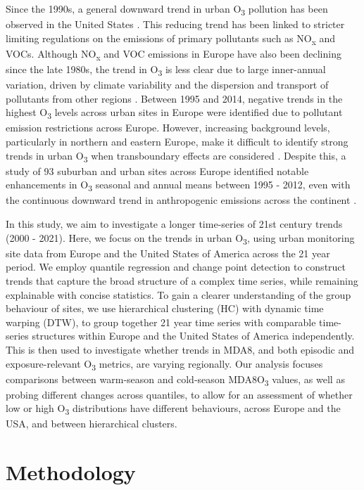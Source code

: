 \documentclass[journal abbreviation, manuscript]{copernicus}
\begin{document}
Since the 1990s, a general downward trend in urban O\textsubscript{3} pollution has been observed in the United States \citep{acp-20-3191-2020}. This reducing trend has been linked to stricter limiting regulations on the emissions of primary pollutants such as NO\textsubscript{x} and VOCs. Although NO\textsubscript{x} and VOC emissions in Europe have also been declining since the late 1980s, the trend in O\textsubscript{3} is less clear due to large inner-annual variation, driven by climate variability and the dispersion and transport of pollutants from other regions \citep{acp-6-51-2006, acp-18-5589-2018}. Between 1995 and 2014, negative trends in the highest O\textsubscript{3} levels across urban sites in Europe were identified due to pollutant emission restrictions across Europe. However, increasing background levels, particularly in northern and eastern Europe, make it difficult to identify strong trends in urban O\textsubscript{3} when transboundary effects are considered \citep{acp-18-5589-2018}. Despite this, a study of 93 suburban and urban sites across Europe identified notable enhancements in O\textsubscript{3} seasonal and annual means between 1995 - 2012, even with the continuous downward trend in anthropogenic emissions across the continent \citep{acp-18-5589-2018}.

In this study, we aim to investigate a longer time-series of 21st century trends (2000 - 2021). Here, we focus on the trends in urban O\textsubscript{3}, using urban monitoring site data from Europe and the United States of America across the 21 year period. We employ quantile regression and change point detection to construct trends that capture the broad structure of a complex time series, while remaining explainable with concise statistics. To gain a clearer understanding of the group behaviour of sites, we use hierarchical clustering (HC) with dynamic time warping (DTW), to group together 21 year time series with comparable time-series structures within Europe and the United States of America independently. This is then used to investigate whether trends in MDA8, and both episodic and exposure-relevant O\textsubscript{3} metrics, are varying regionally. Our analysis focuses comparisons between warm-season and cold-season MDA8O\textsubscript{3} values, as well as probing different changes across quantiles, to allow for an assessment of whether low or high O\textsubscript{3} distributions have different behaviours, across Europe and the USA, and between hierarchical clusters.

\section{Methodology} \label{sect:method}
\end{document}
